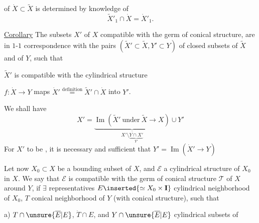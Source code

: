 of $\dot X\subset\widetilde X$ is determined by knowledge of
\[
\widetilde X'_1\cap\dot X=\dot X'_1.
\]

\uline{Corollary} The  subsets $X'$ of $X$ compatible with
the germ of conical structure, are in
$1$-$1$ correspondence with the pairs $(\widetilde X'\subset\widetilde X,Y'\subset Y)$
of closed subsets of $\widetilde X$ and of $Y$, such that

 $\widetilde X'$ is compatible with the  cylindrical structure

 $f:\dot X\to Y$ maps 
$\dot X'\overset{\text{definition}}{=}\widetilde X'\cap\dot X$ into $Y'$.

We shall have
\[
X'=\underbrace{\operatorname{Im}(\widetilde X'\ \text{under}\ \widetilde X\to X)}
_{\overline{X'\setminus\underbrace{Y\cap X'}_{Y'}}}\cup Y'
\]
For $X'$ to be 
,
it is necessary and sufficient that $Y'=\operatorname{Im}(\dot X'\to Y)$

Let now $X_0\subset X$ be a
bounding subset of $X$, and $\mathcal E$ a  cylindrical structure
of $X_0$ in $X$. We say that $\mathcal E$ is compatible
with the germ of conical structure $\mathcal T$
of $X$ around $Y$, if $\exists$ representatives
$E\inserted{\simeq X_0\times\mathbf I}$ cylindrical neighborhood of $X_0$,  $T$ conical neighborhood
of $Y$ (with  conical structure), such that


a) $T\cap\unsure{\overline E|E}$, $\dot T\cap E$, and $Y\cap\unsure{\overline E|E}$
  cylindrical subsets of

